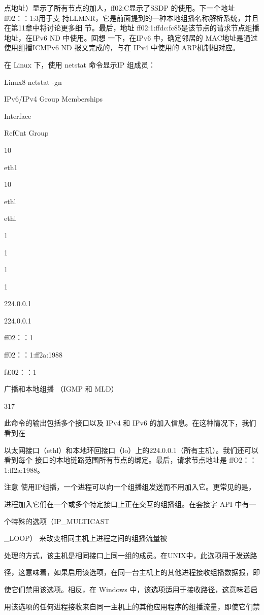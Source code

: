 点地址）显示了所有节点的加人，ff02:C显示了SSDP 的使用。下一个地址 ff02：：1:3用于支
持LLMNR，它是前面提到的一种本地组播名称解析系统，并且在第11章中将讨论更多细
节。最后，地址 ff02:1:ffdc:fc85是该节点的请求节点组播地址，在IPv6 ND 中使用。回想
一下，在IPv6 中，确定邻居的 MAC地址是通过使用组播ICMPv6 ND 报文完成的，与在
IPv4 中使用的 ARP机制相对应。

在 Linux 下，使用 netstat 命令显示IP 组成员：

Linux8 netstat -gn

IPv6/IPv4 Group Memberships

Interface

RefCnt Group

10

eth1

10

ethl

ethl

1

1

1

1

224.0.0.1

224.0.0.1

ff02：：1

ff02：：1:ff2a:1988

f£02：：1

广播和本地组播 （IGMP 和 MLD）

317

此命令的输出包括多个接口以及 IPv4 和 IPv6 的加入信息。在这种情况下，我们看到在

以太网接口（ethl）和本地环回接口（lo）上的224.0.0.1（所有主机）。我们还可以看到每个
接口的本地链路范围所有节点的绑定。最后，请求节点地址是 ffO2：：1:ff2a:1988。

注意 使用IP组播，一个进程可以向一个组播组发送而不用加入它。更常见的是，

进程加入它们在一个或多个特定接口上正在交互的组播组。在套接字 API 中有一

个特殊的选项（IP\_MULTICAST

\_LOOP） 来改变相同主机上进程之间的组播流量被

处理的方式，该主机是相同接口上同一组的成员。在UNIX中，此选项用于发送路

径，这意味着，如果启用该选项，在同一台主机上的其他进程接收组播数据报，即

使它们禁用该选项。相反，在 Windows 中，该选项适用于接收路径，这意味着启

用该选项的任何进程接收来自同一主机上的其他应用程序的组播流量，即使它们禁

